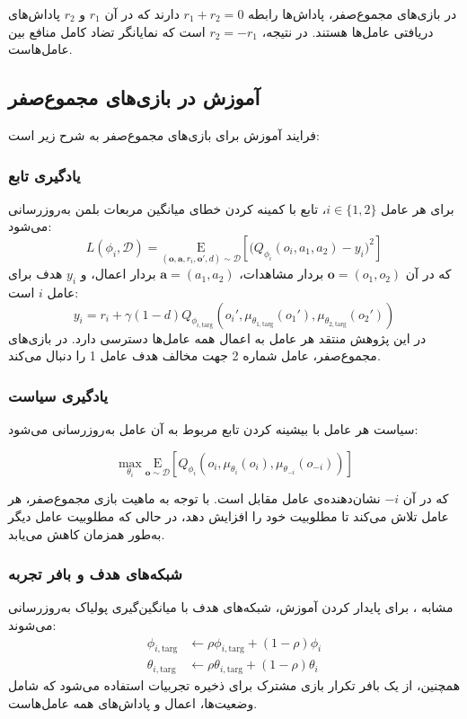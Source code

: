 در بازی‌های مجموع­‌صفر، پاداش‌ها رابطه $r_1 + r_2 = 0$ دارند که در آن $r_1$ و $r_2$ پاداش‌های دریافتی عامل‌ها هستند. در نتیجه، $r_2 = -r_1$ است که نمایانگر تضاد کامل منافع بین عامل‌هاست.

\subsection{آموزش  در بازی‌های مجموع­‌صفر}
فرایند آموزش  برای بازی‌های مجموع­‌صفر به شرح زیر است:
\subsubsection{یادگیری تابع }
برای هر عامل $i \in \{1, 2\}$، تابع  با کمینه کردن خطای میانگین مربعات بلمن به‌روزرسانی می‌شود:
\begin{equation}
    L(\phi_i, \mathcal{D}) = \underset{(\boldsymbol{o}, \boldsymbol{a}, r_i, \boldsymbol{o}', d) \sim \mathcal{D}}{\mathrm{E}}\left[ 
    \Bigg( Q_{\phi_i}(o_i, a_1, a_2) - y_i \Bigg)^2
    \right]
\end{equation}
که در آن $\boldsymbol{o} = (o_1, o_2)$ بردار مشاهدات، $\boldsymbol{a} = (a_1, a_2)$ بردار اعمال، و $y_i$ هدف برای عامل $i$ است:
\begin{equation}
    y_i = r_i + \gamma (1 - d) Q_{\phi_{i,\text{targ}}}(o_i', \mu_{\theta_{1,\text{targ}}}(o_1'), \mu_{\theta_{2,\text{targ}}}(o_2'))
\end{equation}
در این پژوهش منتقد هر عامل به اعمال همه عامل‌ها دسترسی دارد. در بازی‌های مجموع­‌صفر، عامل شماره 2 جهت مخالف هدف عامل 1 را دنبال می‌کند.

\subsubsection{یادگیری سیاست}

سیاست هر عامل با بیشینه کردن تابع  مربوط به آن عامل به‌روزرسانی می‌شود:

\begin{equation}
    \max_{\theta_i} \underset{\boldsymbol{o} \sim \mathcal{D}}{\mathrm{E}}\left[ Q_{\phi_i}(o_i, \mu_{\theta_i}(o_i), \mu_{\theta_{-i}}(o_{-i})) \right]
\end{equation}

که در آن $-i$ نشان‌دهنده‌ی عامل مقابل است. با توجه به ماهیت بازی مجموع‌صفر، هر عامل تلاش می‌کند تا مطلوبیت خود را افزایش دهد، در حالی که مطلوبیت عامل دیگر به‌طور همزمان کاهش می‌یابد.
\subsubsection{شبکه‌های هدف و بافر تجربه}
مشابه ، برای پایدار کردن آموزش، شبکه‌های هدف با میانگین‌گیری پولیاک به‌روزرسانی می‌شوند:
\begin{align*}
    \phi_{i,\text{targ}} &\leftarrow \rho \phi_{i,\text{targ}} + (1 - \rho) \phi_i \\
    \theta_{i,\text{targ}} &\leftarrow \rho \theta_{i,\text{targ}} + (1 - \rho) \theta_i
\end{align*}
همچنین، از یک بافر تکرار بازی مشترک برای ذخیره تجربیات استفاده می‌شود که شامل وضعیت‌ها، اعمال و پاداش‌های همه عامل‌هاست.

